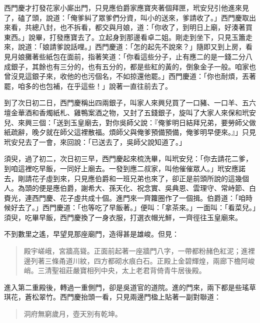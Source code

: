 西門慶才打發花家小廝出門，只見應伯爵家應寶夾著個拜匣，玳安兒引他進來見了，磕了頭，說道：「俺爹糾了眾爹們分資，叫小的送來，爹請收了。」西門慶取出來看，共總八封，也不拆看，都交與月娘，道：「你收了，到明日上廟，好湊著買東西。」說畢，打發應寶去了。立起身到那邊看卓二姐。剛走到坐下，只見玉簫走來，說道：「娘請爹說話哩。」西門慶道：「怎的起先不說來？」隨即又到上房，看見月娘攤著些紙包在面前，指著笑道：「你看這些分子，止有應二的是一錢二分八成銀子，其餘也有三分的，也有五分的，都是些紅的黃的，倒象金子一般。咱家也曾沒見這銀子來，收他的也污個名，不如掠還他罷。」西門慶道：「你也耐煩，丟著罷，咱多的也包補，在乎這些！」說著一直往前去了。

到了次日初二日，西門慶稱出四兩銀子，叫家人來興兒買了一口豬、一口羊、五六壇金華酒和香燭紙札、雞鴨案酒之物，又封了五錢銀子，旋叫了大家人來保和玳安兒、來興三個：「送到玉皇廟去，對你吳師父說：『俺爹明日結拜兄弟，要勞師父做紙疏辭，晚夕就在師父這裡散福。煩師父與俺爹預備預備，俺爹明早便來。』」只見玳安兒去了一會，來回說：「已送去了，吳師父說知道了。」

須臾，過了初二，次日初三早，西門慶起來梳洗畢，叫玳安兒：「你去請花二爹，到咱這裡吃早飯，一同好上廟去。一發到應二叔家，叫他催催眾人。」玳安應諾去，剛請花子虛到來，只見應伯爵和一班兄弟也來了，卻正是前頭所說的這幾個人。為頭的便是應伯爵，謝希大、孫天化、祝念實、吳典恩、雲理守、常峙節、白賚光，連西門慶、花子虛共成十個。進門來一齊籮圈作了一個揖。伯爵道：「咱時候好去了。」西門慶道：「也等吃了早飯著。」便叫：「拿茶來。」一面叫：「看菜兒。」須臾，吃畢早飯，西門慶換了一身衣服，打選衣帽光鮮，一齊徑往玉皇廟來。

不到數里之遙，早望見那座廟門，造得甚是雄峻。但見：
\begin{quote}
殿宇嵯峨，宮牆高聳。正面前起著一座牆門八字，一帶都粉赭色紅泥；進裡邊列著三條甬道川紋，四方都砌水痕白石。正殿上金碧輝煌，兩廊下檐阿峻峭。三清聖祖莊嚴寶相列中央，太上老君背倚青牛居後殿。
\end{quote}

進入第二重殿後，轉過一重側門，卻是吳道官的道院。進的門來，兩下都是些瑤草琪花，蒼松翠竹。西門慶抬頭一看，只見兩邊門楹上貼著一副對聯道：
\begin{quote}
洞府無窮歲月，壺天別有乾坤。
\end{quote}

